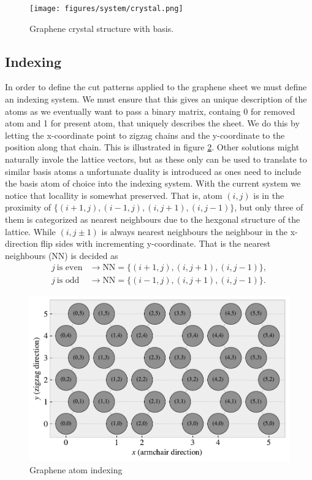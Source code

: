 \begin{figure}[H]
  \centering
  \texttt{[image: figures/system/crystal.png]}
  \caption{Graphene crystal structure with basis.}
  \label{fig:graphene_crystal}
\end{figure}



\subsection{Indexing}

In order to define the cut patterns applied to the graphene sheet we must define
an indexing system. We must ensure that this gives an unique description of the
atoms as we eventually want to pass a binary matrix, containg 0 for removed atom
and 1 for present atom, that uniquely describes the sheet. We do this by letting
the x-coordinate point to zigzag chains and the y-coordinate to the position
along that chain. This is illustrated in figure \ref{fig:atom_indexing}. Other
solutions might naturally invole the lattice vectors, but as these only can be
used to translate to similar basis atoms a unfortunate duality is introduced as
ones need to include the basis atom of choice into the indexing system. With the
current system we notice that locallity is somewhat preserved. That is, atom
$(i, j)$ is in the proximity of $\{(i+1, j), (i-1, j), (i, j+1), (i, j-1)\}$,
but only three of them is categorized as nearest neighbours due to the hexgonal
structure of the lattice. While $(i, j\pm 1)$ is always nearest neighbours the
neighbour in the x-direction flip sides with incrementing y-coordinate. That is
the nearest neighbours (NN) is decided as
\begin{align*}
  j \ \text{is even} &\rightarrow \text{NN} = \{(i+1, j), (i, j+1), (i, j-1)\}, \\
  j \ \text{is odd} &\rightarrow \text{NN} = \{(i-1, j), (i, j+1), (i, j-1)\}.
\end{align*}

\begin{figure}[H]
  \centering
  \includegraphics[width=0.7\linewidth]{figures/system/atom_indexing.pdf}
  \caption{Graphene atom indexing}
  \label{fig:atom_indexing}
\end{figure}

